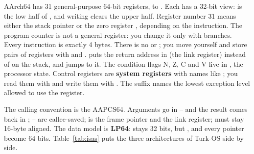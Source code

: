 \documentclass[11pt,a4paper]{article}
\begin{document}
AArch64 has 31 general-purpose 64-bit registers,  to . Each has a 32-bit view:  is the low
half of , and writing  clears the upper half. Register number 31 means either the stack pointer
 or the zero register , depending on the instruction. The program counter is not a general
register: you change it only with branches. Every instruction is exactly 4 bytes. There is no  or
; you move  yourself and store pairs of registers with  and .  puts
the return address in  (the link register) instead of on the stack, and  jumps to it. The
condition flags N, Z, C and V live in , the processor state. Control registers are \textbf{system
registers} with names like ; you read them with  and write them with . The suffix
names the lowest exception level allowed to use the register.

The calling convention is the AAPCS64. Arguments go in -- and the result comes back in ;
-- are callee-saved;  is the frame pointer and  the link register;
 must stay 16-byte aligned. The data model is \textbf{LP64}:  stays 32 bits, but ,
 and every pointer become 64 bits. Table~\ref{tab:isas} puts the three architectures of Turk-OS side by
side.
\end{document}
